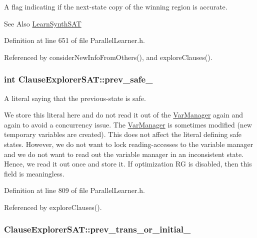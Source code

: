 A flag indicating if the next-\/state copy of the winning region is accurate. 

\begin{DoxySeeAlso}{See Also}
\hyperlink{classLearnSynthSAT}{Learn\-Synth\-S\-A\-T} 
\end{DoxySeeAlso}


Definition at line 651 of file Parallel\-Learner.\-h.



Referenced by consider\-New\-Info\-From\-Others(), and explore\-Clauses().

\hypertarget{classClauseExplorerSAT_ab98b3cf3447591b3e390e3d3a1d595e5}{
\subsubsection[{prev\-\_\-safe\-\_\-}]{\setlength{\rightskip}{0pt plus 5cm}int Clause\-Explorer\-S\-A\-T\-::prev\-\_\-safe\-\_\-\hspace{0.3cm}{\ttfamily [protected]}}}\label{classClauseExplorerSAT_ab98b3cf3447591b3e390e3d3a1d595e5}


A literal saying that the previous-\/state is safe. 

We store this literal here and do not read it out of the \hyperlink{classVarManager}{Var\-Manager} again and again to avoid a concurrency issue. The \hyperlink{classVarManager}{Var\-Manager} is sometimes modified (new temporary variables are created). This does not affect the literal defining safe states. However, we do not want to lock reading-\/accesses to the variable manager and we do not want to read out the variable manager in an inconsistent state. Hence, we read it out once and store it. If optimization R\-G is disabled, then this field is meaningless. 

Definition at line 809 of file Parallel\-Learner.\-h.



Referenced by explore\-Clauses().

\hypertarget{classClauseExplorerSAT_a445dd961b44b493e184ff42207132ea1}{
\subsubsection[{prev\-\_\-trans\-\_\-or\-\_\-initial\-\_\-}]{ Clause\-Explorer\-S\-A\-T\-::prev\-\_\-trans\-\_\-or\-\_\-initial\-\_\-\hspace{0.3cm}{\ttfamily [protected]}}}\label{classClauseExplorerSAT_a445dd961b44b493e184ff42207132ea1}


